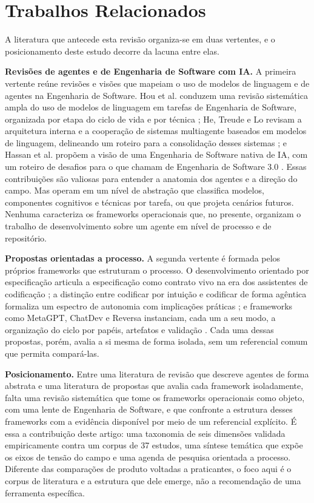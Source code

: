 \section{Trabalhos Relacionados}

A literatura que antecede esta revisão organiza-se em duas vertentes, e o posicionamento deste estudo decorre da lacuna entre elas.

\noindent\textbf{Revisões de agentes e de Engenharia de Software com IA.} A primeira vertente reúne revisões e visões que mapeiam o uso de modelos de linguagem e de agentes na Engenharia de Software. Hou et al. conduzem uma revisão sistemática ampla do uso de modelos de linguagem em tarefas de Engenharia de Software, organizada por etapa do ciclo de vida e por técnica \cite{hou2024llmse}; He, Treude e Lo revisam a arquitetura interna e a cooperação de sistemas multiagente baseados em modelos de linguagem, delineando um roteiro para a consolidação desses sistemas \cite{JundaHe2025}; e Hassan et al. propõem a visão de uma Engenharia de Software nativa de IA, com um roteiro de desafios para o que chamam de Engenharia de Software 3.0 \cite{AhmedEHassan2024}. Essas contribuições são valiosas para entender a anatomia dos agentes e a direção do campo. Mas operam em um nível de abstração que classifica modelos, componentes cognitivos e técnicas por tarefa, ou que projeta cenários futuros. Nenhuma caracteriza os frameworks operacionais que, no presente, organizam o trabalho de desenvolvimento sobre um agente em nível de processo e de repositório.

\noindent\textbf{Propostas orientadas a processo.} A segunda vertente é formada pelos próprios frameworks que estruturam o processo. O desenvolvimento orientado por especificação articula a especificação como contrato vivo na era dos assistentes de codificação \cite{DeepakBabuPiskala2026}; a distinção entre codificar por intuição e codificar de forma agêntica formaliza um espectro de autonomia com implicações práticas \cite{RanjanSapkota2025}; e frameworks como MetaGPT, ChatDev e Reversa instanciam, cada um a seu modo, a organização do ciclo por papéis, artefatos e validação \cite{SiruiHong2023,ChenQian2023,Macedo2026}. Cada uma dessas propostas, porém, avalia a si mesma de forma isolada, sem um referencial comum que permita compará-las.

\noindent\textbf{Posicionamento.} Entre uma literatura de revisão que descreve agentes de forma abstrata e uma literatura de propostas que avalia cada framework isoladamente, falta uma revisão sistemática que tome os frameworks operacionais como objeto, com uma lente de Engenharia de Software, e que confronte a estrutura desses frameworks com a evidência disponível por meio de um referencial explícito. É essa a contribuição deste artigo: uma taxonomia de seis dimensões validada empiricamente contra um corpus de 37 estudos, uma síntese temática que expõe os eixos de tensão do campo e uma agenda de pesquisa orientada a processo. Diferente das comparações de produto voltadas a praticantes, o foco aqui é o corpus de literatura e a estrutura que dele emerge, não a recomendação de uma ferramenta específica.

